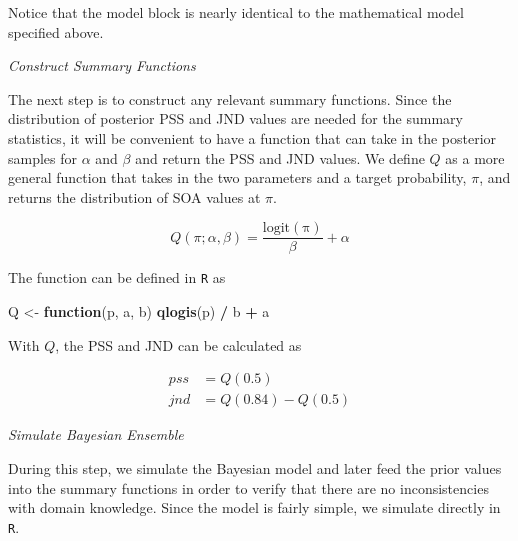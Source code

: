 \documentclass[11pt, oneside, openany]{scrbook}
\newenvironment{Shaded}{\begin{snugshade}}{\end{snugshade}}
\newcommand{\ControlFlowTok}[1]{\textcolor[rgb]{0.13,0.29,0.53}{\textbf{#1}}}
\newcommand{\FunctionTok}[1]{\textcolor[rgb]{0.13,0.29,0.53}{\textbf{#1}}}
\newcommand{\NormalTok}[1]{#1}
\newcommand{\OtherTok}[1]{\textcolor[rgb]{0.56,0.35,0.01}{#1}}
\newcommand{\SpecialCharTok}[1]{\textcolor[rgb]{0.81,0.36,0.00}{\textbf{#1}}}
\begin{document}

Notice that the model block is nearly identical to the mathematical model specified above.

\emph{Construct Summary Functions}

The next step is to construct any relevant summary functions. Since the distribution of posterior PSS and JND values are needed for the summary statistics, it will be convenient to have a function that can take in the posterior samples for \(\alpha\) and \(\beta\) and return the PSS and JND values. We define \(Q\) as a more general function that takes in the two parameters and a target probability, \(\pi\), and returns the distribution of SOA values at \(\pi\).

\begin{equation}
  Q(\pi; \alpha, \beta) = \frac{\mathrm{logit(\pi)}}{\beta} + \alpha
  \label{eq:summfun1}
\end{equation}

The function can be defined in \texttt{R} as

\begin{Shaded}
\begin{Highlighting}[]
\NormalTok{Q }\OtherTok{\textless{}{-}} \ControlFlowTok{function}\NormalTok{(p, a, b) }\FunctionTok{qlogis}\NormalTok{(p) }\SpecialCharTok{/}\NormalTok{ b }\SpecialCharTok{+}\NormalTok{ a}
\end{Highlighting}
\end{Shaded}

With \(Q\), the PSS and JND can be calculated as


\begin{align*}
  pss &= Q(0.5) \\
  jnd &= Q(0.84) - Q(0.5)
\end{align*}

\emph{Simulate Bayesian Ensemble}

During this step, we simulate the Bayesian model and later feed the prior values into the summary functions in order to verify that there are no inconsistencies with domain knowledge. Since the model is fairly simple, we simulate directly in \texttt{R}.

\end{document}

